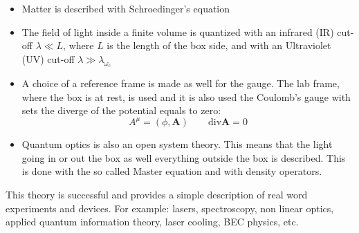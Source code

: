 \documentclass[12pt]{article}
\theoremstyle{plain}
\theoremstyle{definition}
\theoremstyle{remark}
\begin{document}
\begin{itemize}
\item Matter is described with Schroedinger's equation
\item The field of light inside a finite volume is quantized with an infrared (IR) cut-off $\lambda \ll L$, where $L$ is the length of the box side, and with an Ultraviolet (UV) cut-off  $\lambda \gg \lambda_{\omega_{c}}$
\item A choice of a reference frame is made as well for the gauge. The lab frame, where the box is at rest, is used and it is also used the Coulomb's gauge with sets the diverge of the potential equals to zero:
\begin{equation}A^\mu = (\phi, \mathbf{A}) \qquad \text{div}\textbf{A} = 0\end{equation}
\item Quantum optics is also an open system theory. This means that the light going in or out the box as well everything outside the box is described. This is done with the so called Master equation and with density operators.
\end{itemize}
This theory is successful and provides a simple description of real word experiments and devices. For example: lasers, spectroscopy, non linear optics, applied quantum information theory, laser cooling, BEC physics, etc.
\end{document}
